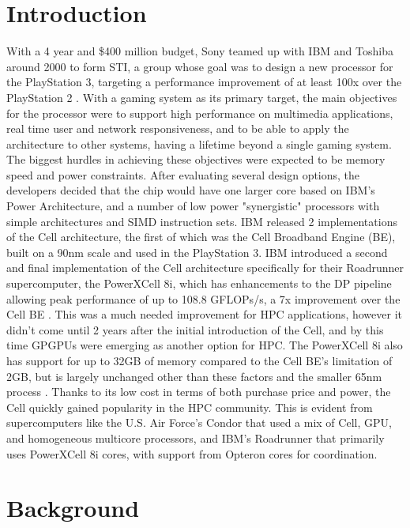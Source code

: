 \documentclass{sig-alternate-05-2015}
\begin{document}
\section{Introduction}
With a 4 year and \$400 million budget, Sony teamed up with IBM and Toshiba around 2000 to form STI, a group whose goal was to design a new processor for the PlayStation 3, targeting a performance improvement of at least 100x over the PlayStation 2 \cite{kahle2005introduction}. With a gaming system as its primary target, the main objectives for the processor were to support high performance on multimedia applications, real time user and network responsiveness, and to be able to apply the architecture to other systems, having a lifetime beyond a single gaming system. The biggest hurdles in achieving these objectives were expected to be memory speed and power constraints. After evaluating several design options, the developers decided that the chip would have one larger core based on IBM's Power Architecture, and a number of low power "synergistic" processors with simple architectures and SIMD instruction sets.
IBM released 2 implementations of the Cell architecture, the first of which was the Cell Broadband Engine (BE), built on a 90nm scale and used in the PlayStation 3. IBM introduced a second and final implementation of the Cell architecture specifically for their Roadrunner supercomputer, the PowerXCell 8i, which has enhancements to the DP pipeline allowing peak performance of up to 108.8 GFLOPs/s, a 7x improvement over the Cell BE \cite{barker2008entering}. This was a much needed improvement for HPC applications, however it didn't come until 2 years after the initial introduction of the Cell, and by this time GPGPUs were emerging as another option for HPC. The PowerXCell 8i also has support for up to 32GB of memory compared to the Cell BE's limitation of 2GB, but is largely unchanged other than these factors and the smaller 65nm process \cite{barker2008entering}. 
Thanks to its low cost in terms of both purchase price and power, the Cell quickly gained popularity in the HPC community. This is evident from supercomputers like the U.S. Air Force's Condor \cite{luley2011energy} that used a mix of Cell, GPU, and homogeneous multicore processors, and IBM's Roadrunner \cite{barker2008entering} that primarily uses PowerXCell 8i cores, with support from Opteron cores for coordination.

\section{Background}
\end{document}
